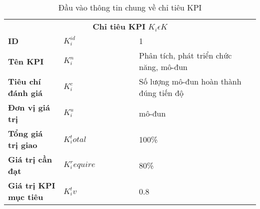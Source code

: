 \documentclass{article}
\begin{document}
        \begin{table} [htbp]
            \caption{Đầu vào thông tin chung về chỉ tiêu KPI}
            \centering
            \begin{tabular}{p{0.22\linewidth} p{0.3\linewidth} p{0.53\linewidth}} 
                \toprule
                \multicolumn{3}{c}{\textbf{Chỉ tiêu KPI} \textit{$K_{i}\epsilon K$}}\\
                \textbf{ID} & $K_i^{id}$ & 1\\ 
                \textbf{Tên KPI} & $K_i^n$ & Phân tích, phát triển chức năng, mô-đun\\
                \textbf{Tiêu chí đánh giá} & $K_i^c$ & Số lượng mô-đun hoàn thành đúng tiến độ\\
                \textbf{Đơn vị giá trị } & $K_i^u$ & mô-đun\\
                \textbf{Tổng giá trị giao} & $K_i^total$ & 100\%\\ 
                \textbf{Giá trị cần đạt} & $K_i^require$ & 80\%\\
                \textbf{Giá trị KPI mục tiêu} & $K_i^tv$ & 0.8\\
                \bottomrule             
            \end{tabular}
            \label{tab:table_input_thongtinchitieukpi}
        \end{table}
\end{document}
